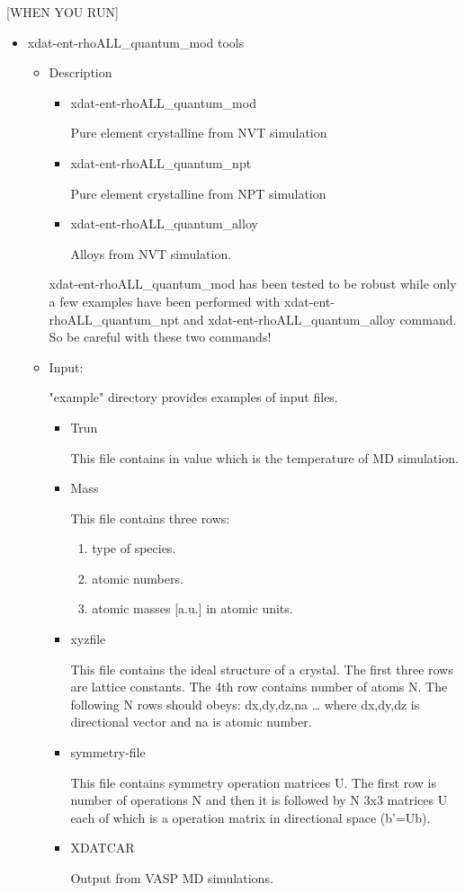 \documentclass[11pt]{article}
\begin{document}
[WHEN YOU RUN]
\begin{itemize}
\item xdat-ent-rhoALL\_quantum\_mod tools

\begin{itemize}
\item Description

\begin{itemize}
\item xdat-ent-rhoALL\_quantum\_mod

Pure element crystalline from NVT simulation

\item xdat-ent-rhoALL\_quantum\_npt

Pure element crystalline from NPT simulation

\item xdat-ent-rhoALL\_quantum\_alloy

Alloys from NVT simulation.
\end{itemize}

xdat-ent-rhoALL\_quantum\_mod has been tested to be robust while only a few
examples have been performed with xdat-ent-rhoALL\_quantum\_npt and
xdat-ent-rhoALL\_quantum\_alloy command. So be careful with these two
commands!

\item Input:

"example" directory provides examples of input files.

\begin{itemize}
\item Trun

This file contains in value which is the temperature of MD simulation.

\item Mass

This file contains three rows:
\begin{enumerate}
\item type of species.
\item atomic numbers.
\item atomic masses [a.u.] in atomic units.
\end{enumerate}

\item xyzfile

This file contains the ideal structure of a crystal.
The first three rows are lattice constants.
The 4th row contains number of atoms N.
The following N rows should obeys:
dx,dy,dz,na \ldots{}
where dx,dy,dz is directional vector and na is atomic number.

\item symmetry-file

This file contains symmetry operation matrices U.
The first row is number of operations N and then it is followed by N 3x3
matrices U each of which is a operation matrix in directional space (b'=Ub).

\item XDATCAR

Output from VASP MD simulations.
\end{itemize}
\end{itemize}
\end{itemize}
\end{document}
